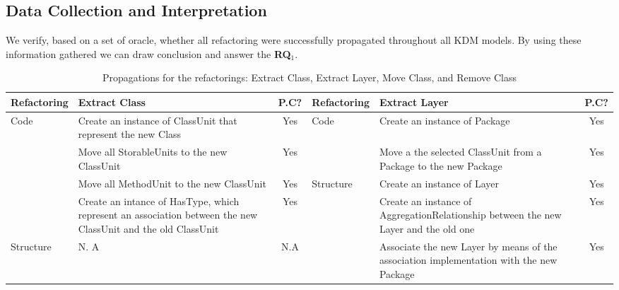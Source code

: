 \subsection{Data Collection and Interpretation}

We verify, based on a set of oracle, whether all refactoring were successfully propagated throughout all KDM models. By using these information gathered we can draw conclusion and answer the \textbf{RQ$_1$}.


\begin{table*}
\centering
\caption{Propagations for the refactorings: Extract Class, Extract Layer, Move Class, and Remove Class\label{tab:prop}}
{\footnotesize{}}%
\setlength{\tabcolsep}{0.0em}
{\renewcommand{\arraystretch}{0.5}
\begin{tabular}{|l|>{\raggedright}p{7cm}|c|l|>{\raggedright}p{7cm}|c|}
\hline 
\textbf{\footnotesize{\cellcolor{gray!40}Refactoring}} & \textbf{\footnotesize{\cellcolor{gray!40}Extract Class}} & \textbf{\footnotesize{\cellcolor{gray!40}P.C?}} & \textbf{\footnotesize{\cellcolor{gray!40}Refactoring}} & \textbf{\footnotesize{\cellcolor{gray!40}Extract Layer}} & \textbf{\footnotesize{\cellcolor{gray!40}P.C?}}\tabularnewline
\hline 
\hline 
\multirow{4}{*}{{\footnotesize{Code}}} & {\footnotesize{Create an instance of ClassUnit that represent the
new Class}} & {\footnotesize{Yes}} & \multirow{2}{*}{{\footnotesize{Code}}} & {\footnotesize{Create an instance of Package}} & {\footnotesize{Yes}}\tabularnewline
\cline{2-3} \cline{5-6} 
 & {\footnotesize{Move all StorableUnits to the new ClassUnit}} & {\footnotesize{Yes}} &  & {\footnotesize{Move a the selected ClassUnit from a Package to the
new Package}} & {\footnotesize{Yes}}\tabularnewline
\cline{2-6} 
 & {\footnotesize{Move all MethodUnit to the new ClassUnit}} & {\footnotesize{Yes}} & \multirow{4}{*}{{\footnotesize{Structure}}} & {\footnotesize{Create an instance of Layer}} & {\footnotesize{Yes}}\tabularnewline
\cline{2-3} \cline{5-6} 
 & {\footnotesize{Create an intance of HasType, which represent an association
between the new ClassUnit and the old ClassUnit}} & {\footnotesize{Yes}} &  & {\footnotesize{Create an instance of AggregationRelationship between
the new Layer and the old one}} & {\footnotesize{Yes}}\tabularnewline
\cline{1-3} \cline{5-6} 
{\footnotesize{Structure }} & {\footnotesize{N. A}} & {\footnotesize{N.A}} &  & {\footnotesize{Associate the new Layer by means of the association
implementation with the new Package}} & {\footnotesize{Yes}}\tabularnewline

\end{tabular}}
\end{table*}
